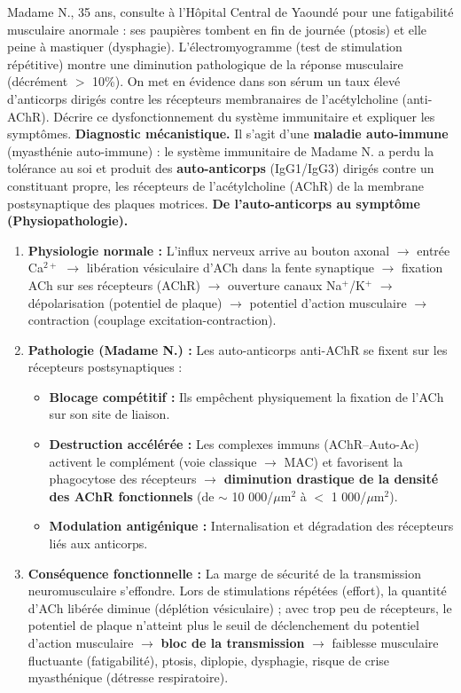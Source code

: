 \documentclass[11pt]{article}
\begin{document}
\begin{exoresolu}
Madame N., 35 ans, consulte à l'Hôpital Central de Yaoundé pour une fatigabilité musculaire anormale : ses paupières tombent en fin de journée (ptosis) et elle peine à mastiquer (dysphagie). L'électromyogramme (test de stimulation répétitive) montre une diminution pathologique de la réponse musculaire (décrément $>$ 10\%). On met en évidence dans son sérum un taux élevé d'anticorps dirigés contre les récepteurs membranaires de l'acétylcholine (anti-AChR). Décrire ce dysfonctionnement du système immunitaire et expliquer les symptômes.
\tcblower
\textbf{Diagnostic mécanistique.} Il s'agit d'une \textbf{maladie auto-immune} (myasthénie auto-immune) : le système immunitaire de Madame N. a perdu la tolérance au soi et produit des \textbf{auto-anticorps} (IgG1/IgG3) dirigés contre un constituant propre, les récepteurs de l'acétylcholine (AChR) de la membrane postsynaptique des plaques motrices.
\textbf{De l'auto-anticorps au symptôme (Physiopathologie).}
\begin{enumerate}
\item \textbf{Physiologie normale :} L'influx nerveux arrive au bouton axonal $\rightarrow$ entrée Ca$^{2+}$ $\rightarrow$ libération vésiculaire d'ACh dans la fente synaptique $\rightarrow$ fixation ACh sur ses récepteurs (AChR) $\rightarrow$ ouverture canaux Na$^{+}$/K$^{+}$ $\rightarrow$ dépolarisation (potentiel de plaque) $\rightarrow$ potentiel d'action musculaire $\rightarrow$ contraction (couplage excitation-contraction).
\item \textbf{Pathologie (Madame N.) :} Les auto-anticorps anti-AChR se fixent sur les récepteurs postsynaptiques :
\begin{itemize}
\item \textbf{Blocage compétitif :} Ils empêchent physiquement la fixation de l'ACh sur son site de liaison.
\item \textbf{Destruction accélérée :} Les complexes immuns (AChR--Auto-Ac) activent le complément (voie classique $\rightarrow$ MAC) et favorisent la phagocytose des récepteurs $\rightarrow$ \textbf{diminution drastique de la densité des AChR fonctionnels} (de $\sim$ 10 000/$\mu$m$^2$ à $<$ 1 000/$\mu$m$^2$).
\item \textbf{Modulation antigénique :} Internalisation et dégradation des récepteurs liés aux anticorps.
\end{itemize}
\item \textbf{Conséquence fonctionnelle :} La marge de sécurité de la transmission neuromusculaire s'effondre. Lors de stimulations répétées (effort), la quantité d'ACh libérée diminue (déplétion vésiculaire) ; avec trop peu de récepteurs, le potentiel de plaque n'atteint plus le seuil de déclenchement du potentiel d'action musculaire $\rightarrow$ \textbf{bloc de la transmission} $\rightarrow$ faiblesse musculaire fluctuante (fatigabilité), ptosis, diplopie, dysphagie, risque de crise myasthénique (détresse respiratoire).

\end{enumerate}
\end{exoresolu}
\end{document}
